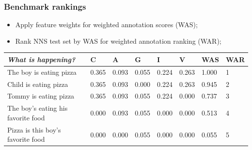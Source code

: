 \documentclass[xcolor={dvipsnames}]{beamer}
\begin{document}
\begin{frame}
\frametitle{Benchmark rankings}
\small
\begin{itemize}
\pause
\item Apply feature weights for weighted annotation scores (WAS);
\pause
\item Rank NNS test set by WAS for weighted annotation ranking (WAR);
\pause
\end{itemize}


\vspace{-1em}
\begin{footnotesize}
\begin{table}[htb!]
\begin{center}
\begin{tabular}{|p{2.7cm}||p{.7cm}|p{.7cm}|p{.7cm}|p{.7cm}|p{.7cm}|p{.7cm}|p{.6cm}|}
\hline
\textit{What is happening?} & C & A & G & I & V & WAS & WAR \\
\hline
\hline
The boy is eating pizza & 0.365 & 0.093 & 0.055 & 0.224 & 0.263 & 1.000 & 1 \\
\hline
Child is eating pizza & 0.365 & 0.093 & 0.000 & 0.224 & 0.263 & 0.945 & 2 \\
\hline
Tommy is eating pizza & 0.365 & 0.093 & 0.055 & 0.224 & 0.000 & 0.737 & 3 \\
\hline
The boy's eating his favorite food & 0.000 & 0.093 & 0.055 & 0.000 & 0.000 & 0.513 & 4 \\
\hline
Pizza is this boy's favorite food & 0.000 & 0.000 & 0.055 & 0.000 & 0.000 & 0.055 & 5 \\
\hline
\end{tabular}
\end{center}
\end{table}
\end{footnotesize}


\end{frame}
\end{document}
